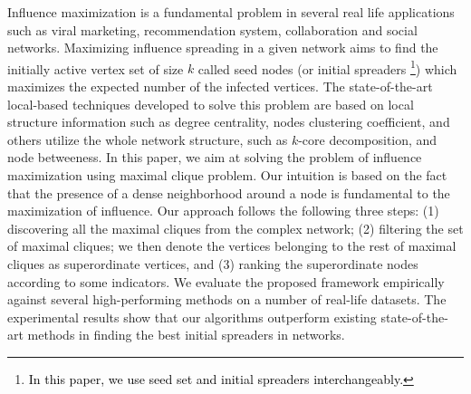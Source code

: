 
Influence maximization is a fundamental problem in several real life applications such as viral marketing, recommendation system, collaboration and social networks.
Maximizing influence spreading in a given network  aims to find  the initially active vertex set of size $k$ called seed nodes (or initial spreaders \footnote{\textcolor{black}{In this paper, we use seed set and initial spreaders interchangeably.}})
which maximizes the expected number of the infected vertices.
The state-of-the-art local-based techniques developed to solve this problem are based  on  local  structure  information  such  as  degree  centrality, nodes clustering  coefficient, and  others  utilize the whole  network  structure, such  as $k$-core decomposition, and node betweeness.
In this paper, we aim at solving the problem of influence maximization using maximal clique problem.
Our intuition is based on the fact that the presence
of  a  dense  neighborhood  around  a  node  is  fundamental  to  the  maximization
of influence.
Our approach follows the following three steps: (1) discovering all the maximal cliques from the complex network; (2) filtering the set of maximal cliques; we then denote the vertices belonging to the rest of maximal cliques as superordinate vertices, and (3) ranking the superordinate nodes according to some indicators.
We evaluate the proposed framework empirically against several high-performing methods on a number of real-life datasets. The experimental results show that our algorithms outperform existing state-of-the-art
methods in finding the best initial spreaders  in networks.


